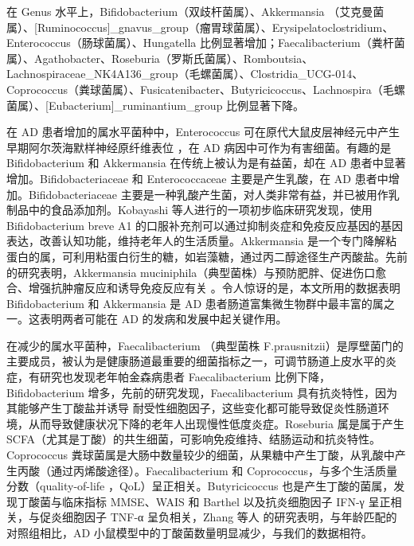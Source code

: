 \documentclass[supercite]{HustGraduPaper}
\begin{document}
在 Genus 水平上，Bifidobacterium（双歧杆菌属）、Akkermansia （艾克曼菌属）、[Ruminococcus]\_gnavus\_group（瘤胃球菌属）、Erysipelatoclostridium、Enterococcus（肠球菌属）、Hungatella 比例显著增加；Faecalibacterium（粪杆菌属）、Agathobacter、Roseburia（罗斯氏菌属）、Romboutsia、Lachnospiraceae\_NK4A136\_group（毛螺菌属）、Clostridia\_UCG-014、Coprococcus（粪球菌属）、Fusicatenibacter、Butyricicoccus、Lachnospira（毛螺菌属）、[Eubacterium]\_ruminantium\_group 比例显著下降。

在 AD 患者增加的属水平菌种中，Enterococcus 可在原代大鼠皮层神经元中产生早期阿尔茨海默样神经原纤维表位 \cite{vogt2017gut}，在 AD 病因中可作为有害细菌。有趣的是 Bifidobacterium 和 Akkermansia 在传统上被认为是有益菌，却在 AD 患者中显著增加。Bifidobacteriaceae 和 Enterococcaceae 主要是产生乳酸，在 AD 患者中增加。Bifidobacteriaceae 主要是一种乳酸产生菌，对人类非常有益，并已被用作乳制品中的食品添加剂\cite{camfield2011dairy}。Kobayashi 等人\cite{kobayashi2017therapeutic}进行的一项初步临床研究发现，使用 Bifidobacterium breve A1 的口服补充剂可以通过抑制炎症和免疫反应基因的基因表达，改善认知功能，维持老年人的生活质量。Akkermansia 是一个专门降解粘蛋白的属，可利用粘蛋白衍生的糖，如岩藻糖，通过丙二醇途径生产丙酸盐\cite{ottman2017genome}。先前的研究表明，Akkermansia muciniphila（典型菌株）与预防肥胖、促进伤口愈合、增强抗肿瘤反应和诱导免疫反应有关\cite{everard2013cross} \cite{greer2016akkermansia}。令人惊讶的是，本文所用的数据表明 Bifidobacterium 和 Akkermansia 是 AD 患者肠道富集微生物群中最丰富的属之一。这表明两者可能在 AD 的发病和发展中起关键作用。

在减少的属水平菌种，Faecalibacterium （典型菌株 F.prausnitzii）是厚壁菌门的主要成员，被认为是健康肠道最重要的细菌指标之一，可调节肠道上皮水平的炎症\cite{sokol2008faecalibacterium}，有研究也发现老年帕金森病患者 Faecalibacterium 比例下降，Bifidobacterium 增多\cite{scheperjans2015gut}，先前的研究发现，Faecalibacterium 具有抗炎特性，因为其能够产生丁酸盐并诱导 耐受性细胞因子\cite{sokol2008faecalibacterium}，这些变化都可能导致促炎性肠道环境，从而导致健康状况下降的老年人出现慢性低度炎症。Roseburia 属是属于产生 SCFA（尤其是丁酸）的共生细菌，可影响免疫维持、结肠运动和抗炎特性\cite{tamanai2017roseburia}。Coprococcus 粪球菌属是大肠中数量较少的细菌，从果糖中产生丁酸，从乳酸中产生丙酸（通过丙烯酸途径）\cite{reichardt2018specific}。Faecalibacterium 和 Coprococcus，与多个生活质量分数（quality-of-life ，QoL）呈正相关\cite{valles2019neuroactive}。Butyricicoccus 也是产生丁酸的菌属，发现丁酸菌与临床指标 MMSE、WAIS 和 Barthel 以及抗炎细胞因子 IFN-γ 呈正相关，与促炎细胞因子 TNF-α 呈负相关，Zhang 等人 \cite{zhang2017altered}的研究表明，与年龄匹配的对照组相比，AD 小鼠模型中的丁酸菌数量明显减少，与我们的数据相符。
\end{document}
